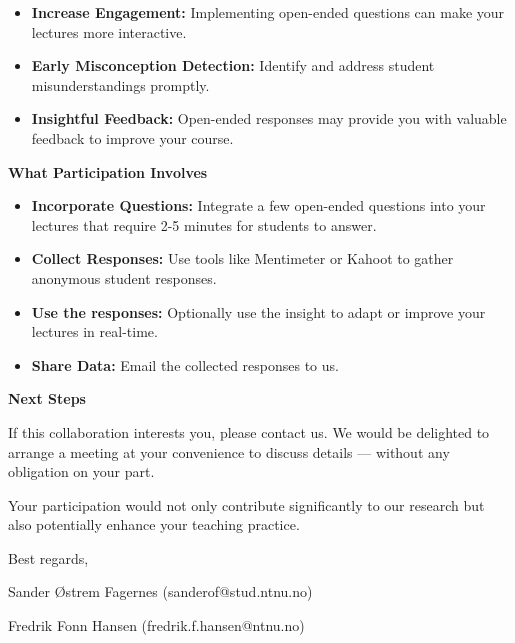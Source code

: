 \begin{itemize}
    \item \textbf{Increase Engagement:} Implementing open-ended questions can make your lectures more interactive.
    \item \textbf{Early Misconception Detection:} Identify and address student misunderstandings promptly.
    \item \textbf{Insightful Feedback:} Open-ended responses may provide you with valuable feedback to improve your course.
\end{itemize}

\textbf{What Participation Involves}

\begin{itemize}
    \item \textbf{Incorporate Questions:} Integrate a few open-ended questions into your lectures that require 2-5 minutes for students to answer.
    \item \textbf{Collect Responses:} Use tools like Mentimeter or Kahoot to gather anonymous student responses.
    \item \textbf{Use the responses:} Optionally use the insight to adapt or improve your lectures in real-time.
    \item \textbf{Share Data:} Email the collected responses to us.
\end{itemize}

\textbf{Next Steps}

If this collaboration interests you, please contact us. We would be delighted to arrange a meeting at your convenience to discuss details — without any obligation on your part.

Your participation would not only contribute significantly to our research but also potentially enhance your teaching practice.

Best regards,

Sander Østrem Fagernes (sanderof@stud.ntnu.no)

Fredrik Fonn Hansen (fredrik.f.hansen@ntnu.no)

\setlength\parskip{0pt plus 1pt}
\setlength\parindent{15pt}
